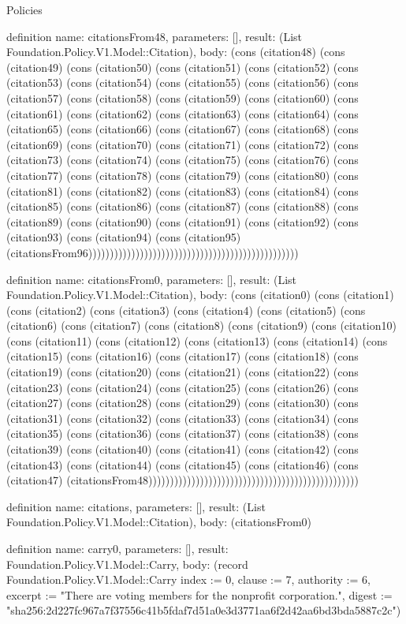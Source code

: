 \begin{lexlean}{Policies}
\begin{semanticmodule}
definition{
  name: citationsFrom48,
  parameters: [],
  result: (List Foundation.Policy.V1.Model::Citation),
  body: (cons (citation48) (cons (citation49) (cons (citation50) (cons (citation51) (cons (citation52) (cons (citation53) (cons (citation54) (cons (citation55) (cons (citation56) (cons (citation57) (cons (citation58) (cons (citation59) (cons (citation60) (cons (citation61) (cons (citation62) (cons (citation63) (cons (citation64) (cons (citation65) (cons (citation66) (cons (citation67) (cons (citation68) (cons (citation69) (cons (citation70) (cons (citation71) (cons (citation72) (cons (citation73) (cons (citation74) (cons (citation75) (cons (citation76) (cons (citation77) (cons (citation78) (cons (citation79) (cons (citation80) (cons (citation81) (cons (citation82) (cons (citation83) (cons (citation84) (cons (citation85) (cons (citation86) (cons (citation87) (cons (citation88) (cons (citation89) (cons (citation90) (cons (citation91) (cons (citation92) (cons (citation93) (cons (citation94) (cons (citation95) (citationsFrom96)))))))))))))))))))))))))))))))))))))))))))))))))
}

definition{
  name: citationsFrom0,
  parameters: [],
  result: (List Foundation.Policy.V1.Model::Citation),
  body: (cons (citation0) (cons (citation1) (cons (citation2) (cons (citation3) (cons (citation4) (cons (citation5) (cons (citation6) (cons (citation7) (cons (citation8) (cons (citation9) (cons (citation10) (cons (citation11) (cons (citation12) (cons (citation13) (cons (citation14) (cons (citation15) (cons (citation16) (cons (citation17) (cons (citation18) (cons (citation19) (cons (citation20) (cons (citation21) (cons (citation22) (cons (citation23) (cons (citation24) (cons (citation25) (cons (citation26) (cons (citation27) (cons (citation28) (cons (citation29) (cons (citation30) (cons (citation31) (cons (citation32) (cons (citation33) (cons (citation34) (cons (citation35) (cons (citation36) (cons (citation37) (cons (citation38) (cons (citation39) (cons (citation40) (cons (citation41) (cons (citation42) (cons (citation43) (cons (citation44) (cons (citation45) (cons (citation46) (cons (citation47) (citationsFrom48)))))))))))))))))))))))))))))))))))))))))))))))))
}

definition{
  name: citations,
  parameters: [],
  result: (List Foundation.Policy.V1.Model::Citation),
  body: (citationsFrom0)
}

definition{
  name: carry0,
  parameters: [],
  result: Foundation.Policy.V1.Model::Carry,
  body: (record Foundation.Policy.V1.Model::Carry {index := 0, clause := 7, authority := 6, excerpt := "There are voting members for the nonprofit corporation.", digest := "sha256:2d227fc967a7f37556c41b5fdaf7d51a0e3d3771aa6f2d42aa6bd3bda5887c2c"})
}


\end{semanticmodule}
\end{lexlean}

